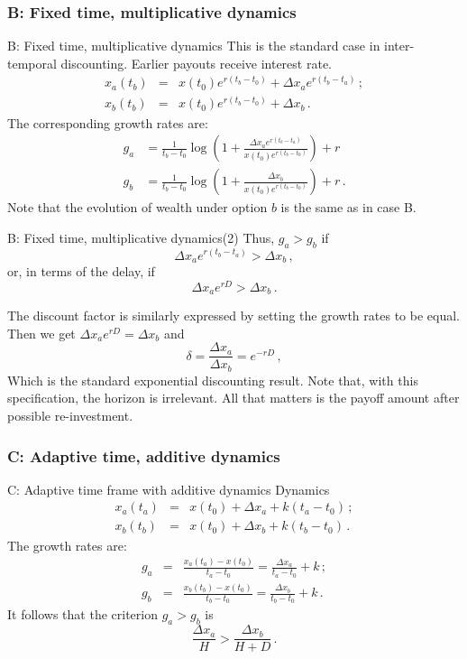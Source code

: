 \documentclass{beamer}
\newcommand{\elabel}[1]{\label{eq:#1}}
\newcommand{\be}{\begin{equation}}
\newcommand{\ee}{\end{equation}}
\newcommand{\bea}{\begin{eqnarray}}
\newcommand{\eea}{\end{eqnarray}}
\newcommand{\Dx}{\Delta x}
\newcommand{\del}{D}
\newcommand{\hor}{H}
\numberwithin{equation}{section}
\begin{document}
\subsubsection{B: Fixed time, multiplicative dynamics}
\begin{frame}{B: Fixed time, multiplicative dynamics}
This is the standard case in inter-temporal discounting. Earlier payouts receive interest rate.
\bea
x_a\left(t_b\right) &=& x\left(t_0\right) e^{r(t_b-t_0)} + \Dx_a e^{r(t_b-t_a)}\,;\\
x_b\left(t_b\right) &=& x\left(t_0\right) e^{r(t_b-t_0)} + \Dx_b\,.
\eea
The corresponding growth rates are:
\bea
g_a &=  \frac{1}{t_b-t_0}\log{\left(1 + \frac{\Dx_a e^{r(t_b-t_a)}}{x\left(t_0\right)e^{r(t_b-t_0)}}\right)} +r \\
g_b &=  \frac{1}{t_b-t_0}\log{\left(1 + \frac{\Dx_b}{x\left(t_0\right)e^{r(t_b-t_0)}}\right)} +r \,.
\eea
Note that the evolution of wealth under option $b$ is the same as in case B.
\end{frame}

\begin{frame}{B: Fixed time, multiplicative dynamics(2)}
Thus, $g_a > g_b$ if
\be
\Dx_a e^{r(t_b-t_a)} > \Dx_b\,,
\ee
or, in terms of the delay, if
\be
\Dx_a e^{r\del} > \Dx_b\,.
\ee

The discount factor is similarly expressed by setting the growth rates to be equal. Then we get $\Dx_a e^{r\del} = \Dx_b$ and
\be
\delta = \frac{\Dx_a}{\Dx_b} = e^{-r\del}\,,
\ee
Which is the standard exponential discounting result. Note that, with this specification, the horizon is irrelevant. All that matters is the payoff amount after possible re-investment.
\end{frame}

\subsubsection{C: Adaptive time, additive dynamics}
\begin{frame}{C: Adaptive time frame with additive dynamics}
Dynamics
\bea
x_a\left(t_a\right) &=& x\left(t_0\right) + \Dx_a + k(t_a-t_0)\,;\\
x_b\left(t_b\right) &=& x\left(t_0\right) + \Dx_b + k(t_b-t_0)\,.
\eea
The growth rates are:
\bea
g_a &=& \frac{x_a\left(t_a\right) - x\left(t_0\right)}{t_a-t_0} = \frac{\Dx_a}{t_a-t_0} + k\,;\\
g_b &=& \frac{x_b\left(t_b\right) - x\left(t_0\right)}{t_b-t_0} = \frac{\Dx_b}{t_b-t_0} + k\,.
\eea
It follows that the criterion $g_a > g_b$ is
%
\be
\frac{\Dx_a}{\hor} > \frac{\Dx_b}{\hor +\del}\,.
\elabel{criterion_caseC}
\ee
\end{frame}
\end{document}
